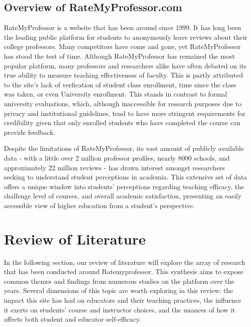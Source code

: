 \documentclass[man, 12pt]{apa7}
\begin{document}
\subsection{Overview of RateMyProfessor.com}
RateMyProfessor is a website that has been around since 1999. It has long been the leading public platform for students to anonymously leave reviews about their college professors. Many competitors have come and gone, yet RateMyProfessor has stood the test of time. Although RateMyProfessor has remained the most popular platform, many professors and researchers alike have often debated on its true ability to measure teaching effectiveness of faculty. This is partly attributed to the site's lack of verfication of student class enrollment, time since the class was taken, or even University enrollment. This stands in contrast to formal university evaluations, which, although inaccessible for research purposes due to privacy and institutional guidelines, tend to have more stringent requirements for credibility given that only enrolled students who have completed the course can provide feedback.

Despite the limitations of RateMyProfessor, its vast amount of publicly available data - with a little over 2 million professor profiles, nearly 8000 schools, and approximately 22 million reviews - has drawn interest amongst researchers seeking to understand student perceptions in academia. This extensive set of data offers a unique window into students' perceptions regarding teaching efficacy, the challenge level of courses, and overall academic satisfaction, presenting an easily accessible view of higher education from a student's perspective.

\section{Review of Literature}
In the following section, our review of literature will explore the array of research that has been conducted around Ratemyprofessor. This synthesis aims to expose common themes and findings from numerous studies on the platform over the years. Several dimensions of this topic are worth exploring in this review: the impact this site has had on educators and their teaching practices, the influence it exerts on students' course and instructor choices, and the nuances of how it affects both student and educator self-efficacy.
\end{document}
